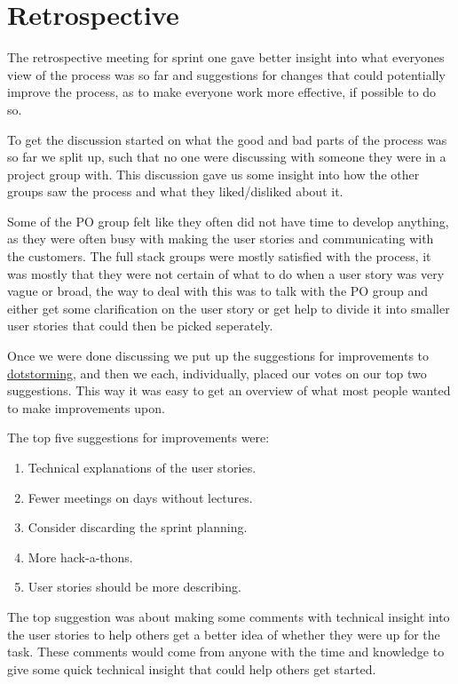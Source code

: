 \section{Retrospective}
The retrospective meeting for sprint one gave better insight into what everyones view of the process was so far and suggestions for changes that could potentially improve the process, as to make everyone work more effective, if possible to do so. 

To get the discussion started on what the good and bad parts of the process was so far we split up, such that no one were discussing with someone they were in a project group with. 
This discussion gave us some insight into how the other groups saw the process and what they liked/disliked about it. 

Some of the PO group felt like they often did not have time to develop anything, as they were often busy with making the user stories and communicating with the customers. 
The full stack groups were mostly satisfied with the process, it was mostly that they were not certain of what to do when a user story was very vague or broad, the way to deal with this was to talk with the PO group and either get some clarification on the user story or get help to divide it into smaller user stories that could then be picked seperately.

Once we were done discussing we put up the suggestions for improvements to \href{www.dotstorming.com}{dotstorming}, and then we each, individually, placed our votes on our top two suggestions.
This way it was easy to get an overview of what most people wanted to make improvements upon.

The top five suggestions for improvements were:
\begin{enumerate}
  \item Technical explanations of the user stories.
  \item Fewer meetings on days without lectures.
  \item Consider discarding the sprint planning.
  \item More hack-a-thons.
  \item User stories should be more describing.
\end{enumerate}

The top suggestion was about making some comments with technical insight into the user stories to help others get a better idea of whether they were up for the task.
These comments would come from anyone with the time and knowledge to give some quick technical insight that could help others get started. 

